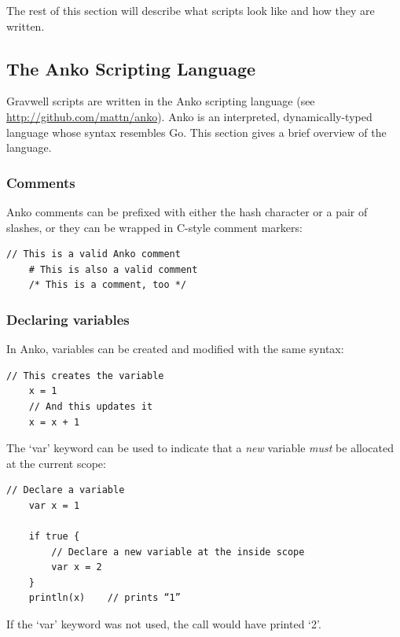 The rest of this section will describe what scripts look like and how
they are written.

\subsection{The Anko Scripting Language}

Gravwell scripts are written in the Anko scripting language (see
\href{http://github.com/mattn/anko}{http://github.com/mattn/anko}).
Anko is an interpreted, dynamically-typed language whose syntax
resembles Go. This section gives a brief overview of the language.

\subsubsection{Comments}

Anko comments can be prefixed with either the hash character or a pair
of slashes, or they can be wrapped in C-style comment markers:

\begin{Verbatim}[breaklines=true]
    // This is a valid Anko comment
    # This is also a valid comment
    /* This is a comment, too */
\end{Verbatim}

\subsubsection{Declaring variables}

In Anko, variables can be created and modified with the same syntax:

\begin{Verbatim}[breaklines=true]
    // This creates the variable
    x = 1
    // And this updates it
    x = x + 1
\end{Verbatim}


The `var' keyword can be used to indicate that a \emph{new} variable
\emph{must} be allocated at the current scope:

\begin{Verbatim}[breaklines=true]
    // Declare a variable
    var x = 1

    if true {
        // Declare a new variable at the inside scope
        var x = 2
    }
    println(x)    // prints “1”
\end{Verbatim}

If the `var' keyword was not used, the  call would have
printed `2'.

